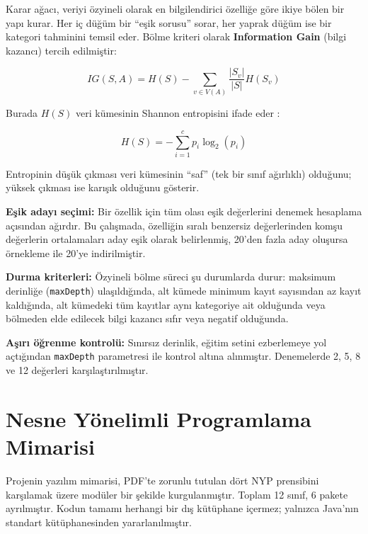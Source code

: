 \documentclass[conference]{IEEEtran}
\begin{document}
Karar ağacı, veriyi özyineli olarak en bilgilendirici özelliğe göre ikiye bölen bir yapı kurar. Her iç düğüm bir ``eşik sorusu'' sorar, her yaprak düğüm ise bir kategori tahminini temsil eder. Bölme kriteri olarak \textbf{Information Gain} (bilgi kazancı) tercih edilmiştir:

\begin{equation}
IG(S, A) = H(S) - \sum_{v \in V(A)} \frac{|S_v|}{|S|} H(S_v)
\end{equation}

Burada $H(S)$ veri kümesinin Shannon entropisini ifade eder \cite{shannon}:

\begin{equation}
H(S) = -\sum_{i=1}^{c} p_i \log_2(p_i)
\end{equation}

Entropinin düşük çıkması veri kümesinin ``saf'' (tek bir sınıf ağırlıklı) olduğunu; yüksek çıkması ise karışık olduğunu gösterir.

\textbf{Eşik adayı seçimi:} Bir özellik için tüm olası eşik değerlerini denemek hesaplama açısından ağırdır. Bu çalışmada, özelliğin sıralı benzersiz değerlerinden komşu değerlerin ortalamaları aday eşik olarak belirlenmiş, 20'den fazla aday oluşursa örnekleme ile 20'ye indirilmiştir.

\textbf{Durma kriterleri:} Özyineli bölme süreci şu durumlarda durur: maksimum derinliğe (\texttt{maxDepth}) ulaşıldığında, alt kümede minimum kayıt sayısından az kayıt kaldığında, alt kümedeki tüm kayıtlar aynı kategoriye ait olduğunda veya bölmeden elde edilecek bilgi kazancı sıfır veya negatif olduğunda.

\textbf{Aşırı öğrenme kontrolü:} Sınırsız derinlik, eğitim setini ezberlemeye yol açtığından \texttt{maxDepth} parametresi ile kontrol altına alınmıştır. Denemelerde 2, 5, 8 ve 12 değerleri karşılaştırılmıştır.

\section{Nesne Yönelimli Programlama Mimarisi}

Projenin yazılım mimarisi, PDF'te zorunlu tutulan dört NYP prensibini karşılamak üzere modüler bir şekilde kurgulanmıştır. Toplam 12 sınıf, 6 pakete ayrılmıştır. Kodun tamamı herhangi bir dış kütüphane içermez; yalnızca Java'nın standart kütüphanesinden yararlanılmıştır.
\end{document}
